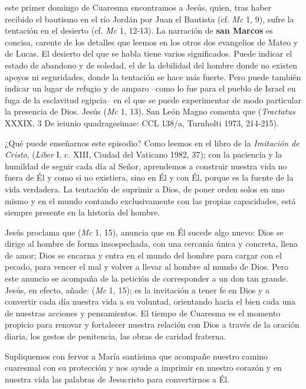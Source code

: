 \begin{body}
 este primer domingo de Cuaresma encontramos a Jesús, quien, tras haber recibido el bautismo en el río Jordán por Juan el Bautista (cf. \textit{Mc} 1, 9), sufre la tentación en el desierto (cf. \textit{Mc} 1, 12-13). La narración de \textbf{san Marcos} es concisa, carente de los detalles que leemos en los otros dos evangelios de Mateo y de Lucas. El desierto del que se habla tiene varios significados. Puede indicar el estado de abandono y de soledad, el  de la debilidad del hombre donde no existen apoyos ni seguridades, donde la tentación se hace más fuerte. Pero puede también indicar un lugar de refugio y de amparo –como lo fue para el pueblo de Israel en fuga de la esclavitud egipcia– en el que se puede experimentar de modo particular la presencia de Dios. Jesús  (\textit{Mc} 1, 13). San León Magno comenta que  (\textit{Tractatus} XXXIX, 3 De ieiunio quadragesimae: CCL 138/a, Turnholti 1973, 214-215).

¿Qué puede enseñarnos este episodio? Como leemos en el libro de la \textit{Imitación de Cristo},  (\textit{Liber} I, c. XIII, Ciudad del Vaticano 1982, 37); con la paciencia y la humildad de seguir cada día al Señor, aprendemos a construir nuestra vida no fuera de Él y como si no existiera, sino en Él y con Él, porque es la fuente de la vida verdadera. La tentación de suprimir a Dios, de poner orden solos en uno mismo y en el mundo contando exclusivamente con las propias capacidades, está siempre presente en la historia del hombre.

Jesús proclama que  (\textit{Mc} 1, 15), anuncia que en Él sucede algo nuevo: Dios se dirige al hombre de forma insospechada, con una cercanía única y concreta, llena de amor; Dios se encarna y entra en el mundo del hombre para cargar con el pecado, para vencer el mal y volver a llevar al hombre al mundo de Dios. Pero este anuncio se acompaña de la petición de corresponder a un don tan grande. Jesús, en efecto, añade:  (\textit{Mc} 1, 15); es la invitación a tener fe en Dios y a convertir cada día nuestra vida a su voluntad, orientando hacia el bien cada una de nuestras acciones y pensamientos. El tiempo de Cuaresma es el momento propicio para renovar y fortalecer nuestra relación con Dios a través de la oración diaria, los gestos de penitencia, las obras de caridad fraterna.

Supliquemos con fervor a María santísima que acompañe nuestro camino cuaresmal con su protección y nos ayude a imprimir en nuestro corazón y en nuestra vida las palabras de Jesucristo para convertirnos a Él.
\end{body}

